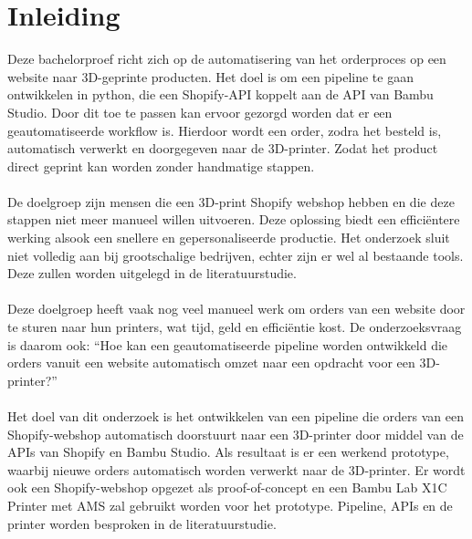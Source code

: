 


% 

\section{Inleiding}%
\label{sec:inleiding}

Deze bachelorproef richt zich op de automatisering van het orderproces op een website naar 3D-geprinte producten. Het doel is om een pipeline te gaan ontwikkelen in python, die een Shopify-API koppelt aan de API van Bambu Studio. Door dit toe te passen kan ervoor gezorgd worden dat er een geautomatiseerde workflow is. Hierdoor wordt een order, zodra het besteld is, automatisch verwerkt en doorgegeven naar de 3D-printer. Zodat het product direct geprint kan worden zonder handmatige stappen.
\\\\
De doelgroep zijn mensen die een 3D-print Shopify webshop hebben en die deze stappen niet meer manueel willen uitvoeren. Deze oplossing biedt een efficiëntere werking alsook een snellere en gepersonaliseerde productie. Het onderzoek sluit niet volledig aan  bij grootschalige bedrijven, echter zijn er wel al bestaande tools. Deze zullen worden uitgelegd in de literatuurstudie.
\\\\
Deze doelgroep heeft vaak nog veel manueel werk om orders van een website door te sturen naar hun printers, wat tijd, geld en efficiëntie kost. De onderzoeksvraag is daarom ook: “Hoe kan een geautomatiseerde pipeline worden ontwikkeld die orders vanuit een website automatisch omzet naar een opdracht voor een 3D-printer?”
\\\\
Het doel van dit onderzoek is het ontwikkelen van een pipeline die orders van een Shopify-webshop automatisch doorstuurt naar een 3D-printer door middel van de APIs van Shopify en Bambu Studio. Als resultaat is er een werkend prototype, waarbij nieuwe orders automatisch worden verwerkt naar de 3D-printer. Er wordt ook een Shopify-webshop opgezet als proof-of-concept en een Ba\-mbu Lab  X1C Printer met AMS zal gebruikt worden voor het prototype. Pipeline, APIs en de printer worden besproken in de literatuurstudie.


